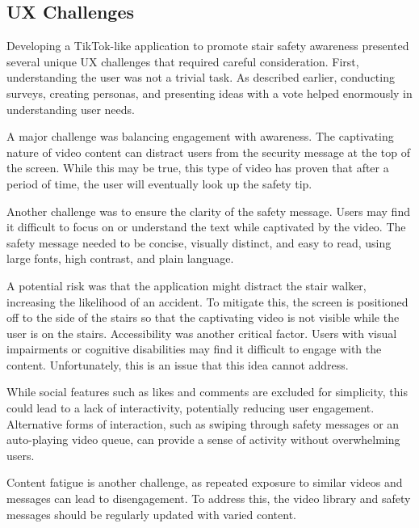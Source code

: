 \documentclass{article}
\begin{document}
\subsection{UX Challenges}
Developing a TikTok-like application to promote stair safety awareness presented several unique UX challenges
that required careful consideration. First, understanding the user was not a trivial task.
As described earlier, conducting surveys, creating personas, and presenting ideas with a vote helped
enormously in understanding user needs.

A major challenge was balancing engagement with awareness.
The captivating nature of video content can distract users from the security message at the top of the screen.
While this may be true, this type of video has proven that after a period of time,
the user will eventually look up the safety tip.

Another challenge was to ensure the clarity of the safety message.
Users may find it difficult to focus on or understand the text while captivated by the video.
The safety message needed to be concise, visually distinct, and easy to read, using large fonts, high contrast, and plain language.

A potential risk was that the application might distract the stair walker, increasing the likelihood of an accident.
To mitigate this, the screen is positioned off to the side of the stairs
so that the captivating video is not visible while the user is on the stairs.
Accessibility was another critical factor.
Users with visual impairments or cognitive disabilities may find it difficult to engage with the content.
Unfortunately, this is an issue that this idea cannot address.

While social features such as likes and comments are excluded for simplicity,
this could lead to a lack of interactivity, potentially reducing user engagement.
Alternative forms of interaction, such as swiping through safety messages or an auto-playing video queue,
can provide a sense of activity without overwhelming users.

Content fatigue is another challenge, as repeated exposure to similar videos and messages can lead to disengagement.
To address this, the video library and safety messages should be regularly updated with varied content.

\end{document}
